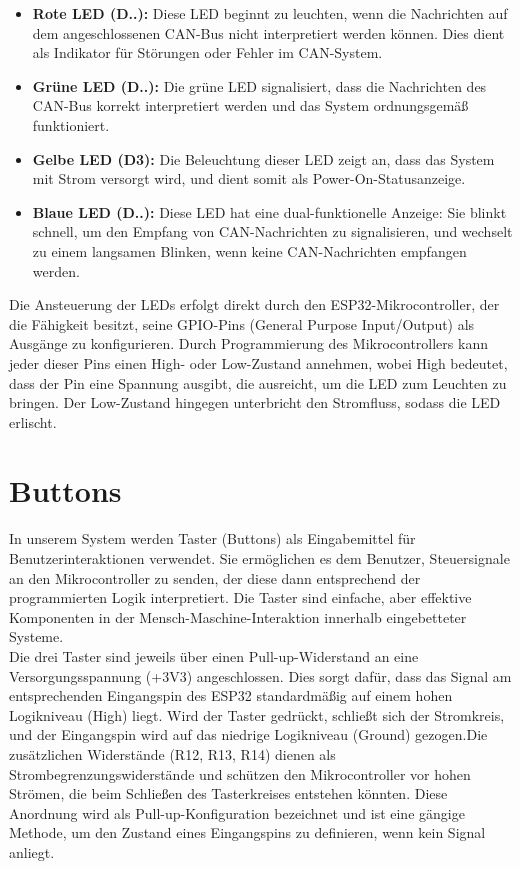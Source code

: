 \begin{itemize}
  \item \textbf{Rote LED (D..):} Diese LED beginnt zu leuchten, wenn die Nachrichten auf dem angeschlossenen CAN-Bus nicht interpretiert werden können. Dies dient als Indikator für Störungen oder Fehler im CAN-System.
  \item \textbf{Grüne LED (D..):} Die grüne LED signalisiert, dass die Nachrichten des CAN-Bus korrekt interpretiert werden und das System ordnungsgemäß funktioniert.
  \item \textbf{Gelbe LED (D3):} Die Beleuchtung dieser LED zeigt an, dass das System mit Strom versorgt wird, und dient somit als Power-On-Statusanzeige.
  \item \textbf{Blaue LED (D..):} Diese LED hat eine dual-funktionelle Anzeige: Sie blinkt schnell, um den Empfang von CAN-Nachrichten zu signalisieren, und wechselt zu einem langsamen Blinken, wenn keine CAN-Nachrichten empfangen werden.
\end{itemize}

\noindent Die Ansteuerung der LEDs erfolgt direkt durch den ESP32-Mikrocontroller, der die Fähigkeit besitzt, seine GPIO-Pins (General Purpose Input/Output) als Ausgänge zu konfigurieren. Durch Programmierung des Mikrocontrollers kann jeder dieser Pins einen High- oder Low-Zustand annehmen, wobei High bedeutet, dass der Pin eine Spannung ausgibt, die ausreicht, um die LED zum Leuchten zu bringen. Der Low-Zustand hingegen unterbricht den Stromfluss, sodass die LED erlischt.\\


\section{Buttons}
\noindent In unserem System werden Taster (Buttons) als Eingabemittel für Benutzerinteraktionen verwendet. Sie ermöglichen es dem Benutzer, Steuersignale an den Mikrocontroller zu senden, der diese dann entsprechend der programmierten Logik interpretiert. Die Taster sind einfache, aber effektive Komponenten in der Mensch-Maschine-Interaktion innerhalb eingebetteter Systeme.\\

\noindent Die drei Taster sind jeweils über einen Pull-up-Widerstand an eine Versorgungsspannung (+3V3) angeschlossen. Dies sorgt dafür, dass das Signal am entsprechenden Eingangspin des ESP32 standardmäßig auf einem hohen Logikniveau (High) liegt. Wird der Taster gedrückt, schließt sich der Stromkreis, und der Eingangspin wird auf das niedrige Logikniveau (Ground) gezogen.Die zusätzlichen Widerstände (R12, R13, R14) dienen als Strombegrenzungswiderstände und schützen den Mikrocontroller vor hohen Strömen, die beim Schließen des Tasterkreises entstehen könnten. Diese Anordnung wird als Pull-up-Konfiguration bezeichnet und ist eine gängige Methode, um den Zustand eines Eingangspins zu definieren, wenn kein Signal anliegt.\\

